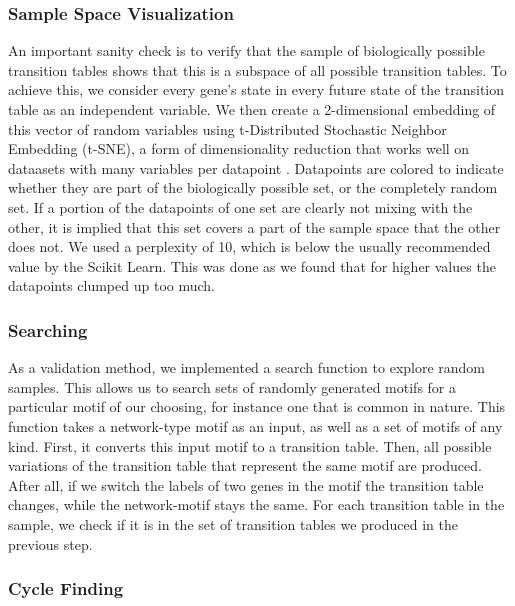 \documentclass[../main.tex]{subfiles}
\begin{document}
\subsubsection{Sample Space Visualization}

An important sanity check is to verify that the sample of biologically possible transition tables shows that this is a subspace of all possible transition tables.
To achieve this, we consider every gene's state in every future state of the transition table as an independent variable.
We then create a 2-dimensional embedding of this vector of random variables using t-Distributed Stochastic Neighbor Embedding (t-SNE), a form of dimensionality reduction that works well on dataasets with many variables per datapoint \cite{maaten2008visualizing}.
Datapoints are colored to indicate whether they are part of the biologically possible set, or the completely random set.
If a portion of the datapoints of one set are clearly not mixing with the other, it is implied that this set covers a part of the sample space that the other does not.
We used a perplexity of 10, which is below the usually recommended value by the Scikit Learn.
This was done as we found that for higher values the datapoints clumped up too much.

\subsubsection{Searching}

As a validation method, we implemented a search function to explore random samples.
This allows us to search sets of randomly generated motifs for a particular motif of our choosing, for instance one that is common in nature.
This function takes a network-type motif as an input, as well as a set of motifs of any kind.
First, it converts this input motif to a transition table.
Then, all possible variations of the transition table that represent the same motif are produced.
After all, if we switch the labels of two genes in the motif the transition table changes, while the network-motif stays the same.
For each transition table in the sample, we check if it is in the set of transition tables we produced in the previous step.

\subsubsection{Cycle Finding}
\end{document}
